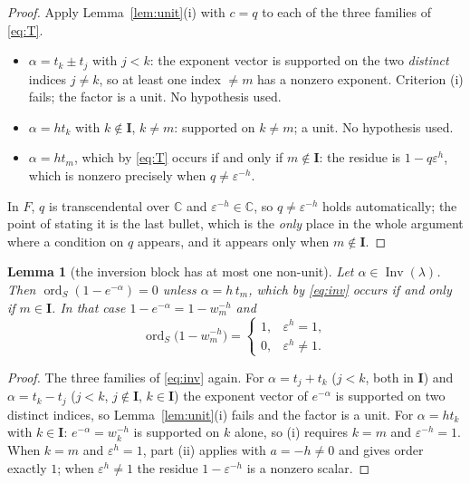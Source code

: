 \documentclass[11pt]{article}
\newtheorem{lem}[thm]{Lemma}
\theoremstyle{definition}
\theoremstyle{remark}
\DeclareMathOperator{\Inv}{Inv}
\DeclareMathOperator{\ord}{ord}
\newcommand{\bI}{\mathbf{I}}
\begin{document}
\begin{proof}
Apply Lemma~\ref{lem:unit}(i) with $c=q$ to each of the three families of \eqref{eq:T}.
\begin{itemize}[leftmargin=1.6em]
\item $\alpha=t_k\pm t_j$ with $j<k$: the exponent vector is supported on the two
  \emph{distinct} indices $j\ne k$, so at least one index $\ne m$ has a nonzero
  exponent.  Criterion (i) fails; the factor is a unit.  No hypothesis used.
\item $\alpha=h t_k$ with $k\notin\bI$, $k\ne m$: supported on $k\ne m$; a unit.  No
  hypothesis used.
\item $\alpha=h t_m$, which by \eqref{eq:T} occurs if and only if $m\notin\bI$:
  the residue is $1-q\varepsilon^{h}$, which is nonzero precisely when
  $q\ne\varepsilon^{-h}$.
\end{itemize}
In $F$, $q$ is transcendental over $\mathbb{C}$ and $\varepsilon^{-h}\in\mathbb{C}$, so
$q\ne\varepsilon^{-h}$ holds automatically; the point of stating it is the last bullet,
which is the \emph{only} place in the whole argument where a condition on $q$ appears,
and it appears only when $m\notin\bI$.
\end{proof}

\begin{lem}[the inversion block has at most one non-unit]\label{lem:Inv}
Let $\alpha\in\Inv(\lambda)$.  Then $\ord_S(1-e^{-\alpha})=0$ unless
$\alpha=h\,t_m$, which by \eqref{eq:inv} occurs if and only if $m\in\bI$.  In that case
$1-e^{-\alpha}=1-w_m^{-h}$ and
\[
  \ord_S\bigl(1-w_m^{-h}\bigr)=
  \begin{cases}
    1,&\varepsilon^{h}=1,\\
    0,&\varepsilon^{h}\ne1 .
  \end{cases}
\]
\end{lem}

\begin{proof}
The three families of \eqref{eq:inv} again.  For $\alpha=t_j+t_k$ ($j<k$, both in $\bI$)
and $\alpha=t_k-t_j$ ($j<k$, $j\notin\bI$, $k\in\bI$) the exponent vector of
$e^{-\alpha}$ is supported on two distinct indices, so Lemma~\ref{lem:unit}(i) fails and
the factor is a unit.  For $\alpha=h t_k$ with $k\in\bI$: $e^{-\alpha}=w_k^{-h}$ is
supported on $k$ alone, so (i) requires $k=m$ and $\varepsilon^{-h}=1$.  When $k=m$ and
$\varepsilon^{h}=1$, part (ii) applies with $a=-h\ne0$ and gives order exactly $1$;
when $\varepsilon^{h}\ne1$ the residue $1-\varepsilon^{-h}$ is a nonzero scalar.
\end{proof}
\end{document}
